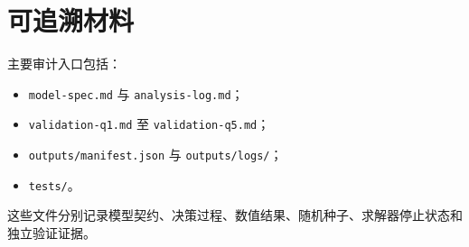 \documentclass[UTF8,zihao=-4]{ctexart}
\begin{document}
\section{可追溯材料}

主要审计入口包括：
\begin{itemize}
  \item \nolinkurl{model-spec.md} 与 \nolinkurl{analysis-log.md}；
  \item \nolinkurl{validation-q1.md} 至 \nolinkurl{validation-q5.md}；
  \item \nolinkurl{outputs/manifest.json} 与 \nolinkurl{outputs/logs/}；
  \item \nolinkurl{tests/}。
\end{itemize}
这些文件分别记录模型契约、决策过程、数值结果、随机种子、求解器停止状态和独立验证证据。
\end{document}
